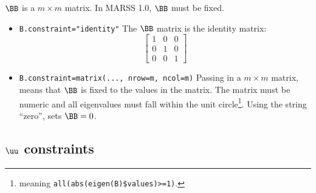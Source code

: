 $\BB$ is a $m \times m$ matrix.  In MARSS 1.0, $\BB$ must be fixed.  
\begin{itemize}\itemsep5pt
\item[] \texttt{B.constraint="identity"} The $\BB$ matrix is the identity matrix:
\begin{equation*}
 \left[ \begin{array}{ccc}
    1 & 0 & 0\\
    0 & 1 & 0 \\
    0 & 0 & 1 \end{array} \right]
\end{equation*}
\item[] \texttt{B.constraint=matrix(..., nrow=m, ncol=m)}  Passing in a $m \times m$ matrix, means that $\BB$ is fixed to the values in the matrix. The matrix must be numeric and all eigenvalues must fall within the unit circle\footnote{meaning \texttt{all(abs(eigen(B)\$values)>=1)}.}.  Using the string ``zero'', sets $\BB=0$.
\end{itemize}

\subsection{$\uu$ constraints}

